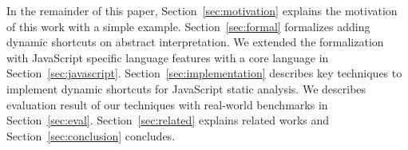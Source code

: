 In the remainder of this paper, Section~\ref{sec:motivation} explains the
motivation of this work with a simple example.  Section~\ref{sec:formal}
formalizes adding dynamic shortcuts on abstract interpretation.  We extended the
formalization with JavaScript specific language features with a core language in
Section~\ref{sec:javascript}.  Section~\ref{sec:implementation} describes
key techniques to implement dynamic shortcuts for JavaScript static analysis.
We describes evaluation result of our techniques with real-world benchmarks in
Section~\ref{sec:eval}.  Section~\ref{sec:related} explains related works and
Section~\ref{sec:conclusion} concludes.
